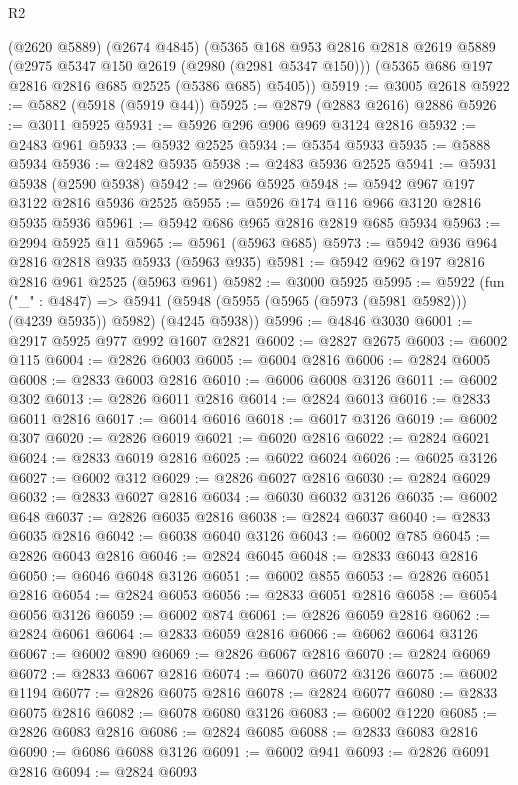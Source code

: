 \begin{lexlean}{R2}
\begin{coremodule}
    (@2620 @5889)
    (@2674 @4845)
    (@5365
      @168
      @953
      @2816
      @2818
      @2619
      @5889
      (@2975 @5347 @150 @2619 (@2980 (@2981 @5347 @150)))
      (@5365 @686 @197 @2816 @2816 @685 @2525 (@5386 @685) @5405))
@5919 := @3005 @2618
@5922 := @5882 (@5918 (@5919 @44))
@5925 := @2879 (@2883 @2616) @2886
@5926 := @3011 @5925
@5931 := @5926 @296 @906 @969 @3124 @2816
@5932 := @2483 @961
@5933 := @5932 @2525
@5934 := @5354 @5933
@5935 := @5888 @5934
@5936 := @2482 @5935
@5938 := @2483 @5936 @2525
@5941 := @5931 @5938 (@2590 @5938)
@5942 := @2966 @5925
@5948 := @5942 @967 @197 @3122 @2816 @5936 @2525
@5955 := @5926 @174 @116 @966 @3120 @2816 @5935 @5936
@5961 := @5942 @686 @965 @2816 @2819 @685 @5934
@5963 := @2994 @5925 @11
@5965 := @5961 (@5963 @685)
@5973 := @5942 @936 @964 @2816 @2818 @935 @5933 (@5963 @935)
@5981 := @5942 @962 @197 @2816 @2816 @961 @2525 (@5963 @961)
@5982 := @3000 @5925
@5995 := @5922
    (fun ("_" : @4847) =>
    @5941 (@5948 (@5955 (@5965 (@5973 (@5981 @5982))) (@4239 @5935)) @5982) (@4245 @5938))
@5996 := @4846 @3030
@6001 := @2917 @5925 @977 @992 @1607 @2821
@6002 := @2827 @2675
@6003 := @6002 @115
@6004 := @2826 @6003
@6005 := @6004 @2816
@6006 := @2824 @6005
@6008 := @2833 @6003 @2816
@6010 := @6006 @6008 @3126
@6011 := @6002 @302
@6013 := @2826 @6011 @2816
@6014 := @2824 @6013
@6016 := @2833 @6011 @2816
@6017 := @6014 @6016
@6018 := @6017 @3126
@6019 := @6002 @307
@6020 := @2826 @6019
@6021 := @6020 @2816
@6022 := @2824 @6021
@6024 := @2833 @6019 @2816
@6025 := @6022 @6024
@6026 := @6025 @3126
@6027 := @6002 @312
@6029 := @2826 @6027 @2816
@6030 := @2824 @6029
@6032 := @2833 @6027 @2816
@6034 := @6030 @6032 @3126
@6035 := @6002 @648
@6037 := @2826 @6035 @2816
@6038 := @2824 @6037
@6040 := @2833 @6035 @2816
@6042 := @6038 @6040 @3126
@6043 := @6002 @785
@6045 := @2826 @6043 @2816
@6046 := @2824 @6045
@6048 := @2833 @6043 @2816
@6050 := @6046 @6048 @3126
@6051 := @6002 @855
@6053 := @2826 @6051 @2816
@6054 := @2824 @6053
@6056 := @2833 @6051 @2816
@6058 := @6054 @6056 @3126
@6059 := @6002 @874
@6061 := @2826 @6059 @2816
@6062 := @2824 @6061
@6064 := @2833 @6059 @2816
@6066 := @6062 @6064 @3126
@6067 := @6002 @890
@6069 := @2826 @6067 @2816
@6070 := @2824 @6069
@6072 := @2833 @6067 @2816
@6074 := @6070 @6072 @3126
@6075 := @6002 @1194
@6077 := @2826 @6075 @2816
@6078 := @2824 @6077
@6080 := @2833 @6075 @2816
@6082 := @6078 @6080 @3126
@6083 := @6002 @1220
@6085 := @2826 @6083 @2816
@6086 := @2824 @6085
@6088 := @2833 @6083 @2816
@6090 := @6086 @6088 @3126
@6091 := @6002 @941
@6093 := @2826 @6091 @2816
@6094 := @2824 @6093

\end{coremodule}
\end{lexlean}
